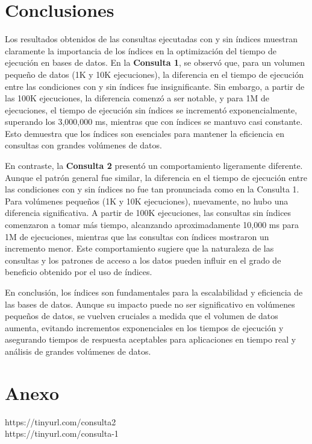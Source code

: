 \documentclass[12pt,a4paper]{article}
\begin{document}
\section{Conclusiones}

Los resultados obtenidos de las consultas ejecutadas con y sin índices muestran claramente la importancia de los índices en la optimización del tiempo de ejecución en bases de datos. En la \textbf{Consulta 1}, se observó que, para un volumen pequeño de datos (1K y 10K ejecuciones), la diferencia en el tiempo de ejecución entre las condiciones con y sin índices fue insignificante. Sin embargo, a partir de las 100K ejecuciones, la diferencia comenzó a ser notable, y para 1M de ejecuciones, el tiempo de ejecución sin índices se incrementó exponencialmente, superando los 3,000,000 ms, mientras que con índices se mantuvo casi constante. Esto demuestra que los índices son esenciales para mantener la eficiencia en consultas con grandes volúmenes de datos.

En contraste, la \textbf{Consulta 2} presentó un comportamiento ligeramente diferente. Aunque el patrón general fue similar, la diferencia en el tiempo de ejecución entre las condiciones con y sin índices no fue tan pronunciada como en la Consulta 1. Para volúmenes pequeños (1K y 10K ejecuciones), nuevamente, no hubo una diferencia significativa. A partir de 100K ejecuciones, las consultas sin índices comenzaron a tomar más tiempo, alcanzando aproximadamente 10,000 ms para 1M de ejecuciones, mientras que las consultas con índices mostraron un incremento menor. Este comportamiento sugiere que la naturaleza de las consultas y los patrones de acceso a los datos pueden influir en el grado de beneficio obtenido por el uso de índices.

En conclusión, los índices son fundamentales para la escalabilidad y eficiencia de las bases de datos. Aunque su impacto puede no ser significativo en volúmenes pequeños de datos, se vuelven cruciales a medida que el volumen de datos aumenta, evitando incrementos exponenciales en los tiempos de ejecución y asegurando tiempos de respuesta aceptables para aplicaciones en tiempo real y análisis de grandes volúmenes de datos.


\section{Anexo}
\begin{center}
    https://tinyurl.com/consulta2
    \\
    https://tinyurl.com/consulta-1
\end{center}
\end{document}
